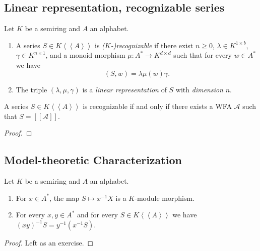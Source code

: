\subsection{Linear representation, recognizable series}

\begin{definition}
    Let $K$ be a semiring and $A$ an alphabet.
    \begin{enumerate}[(1)]
        \item A series $S \in K \left<\left<A\right>\right>$ is \emph{($K$-)recognizable}
        if there exist $n \ge 0$, $\lambda \in K^{1 \times b}$, $\gamma \in K^{n \times 1}$,
        and a monoid morphism $\mu \colon A^* \to K^{d \times d}$ such that for every 
        $w \in A^*$ we have
        \[
            (S, w) = \lambda \mu(w) \gamma.
        \]
        \item The triple $(\lambda, \mu, \gamma)$ is a \emph{linear representation}
        of $S$ with \emph{dimension} $n$.
    \end{enumerate}
\end{definition}

\begin{proposition}
    A series $S \in K \left<\left<A\right>\right>$ is recognizable if and only 
    if there exists a WFA $\mathcal{A}$ such that $S = [[\mathcal{A}]]$.
\end{proposition}

\begin{proof}
    
\end{proof}

\subsection{Model-theoretic Characterization}

\begin{lemma}
    Let $K$ be a semiring and $A$ an alphabet.
    \begin{enumerate}[(1)]
        \item For $x \in A^*$, the map $S \mapsto x^{-1}X$ is a $K$-module 
        morphism.
        \item For every $x,y \in A^*$ and for every $S \in K \left<\left<A\right>\right>$
        we have $(xy)^{-1}S = y^{-1}(x^{-1}S)$.
    \end{enumerate}
\end{lemma}

\begin{proof}
    Left as an exercise.
\end{proof}

